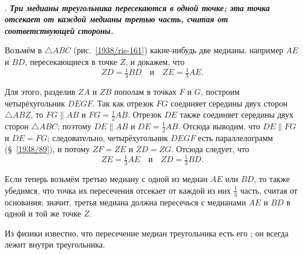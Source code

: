 \paragraph{}\label{1938/143} 
\mbox{.}
\textbf{\emph{Три медианы треугольника пересекаются в одной точке;
эта точка отсекает от каждой медианы третью часть, считая от соответствующей стороны.}}

Возьмём в $\triangle ABC$ (рис.~\ref{1938/ris-161}) какие-нибудь две медианы, например $AE$ и $BD$, пересекающиеся в точке $Z$, и докажем, что
\[ZD=\tfrac13 BD\quad\text{и}\quad ZE = \tfrac13 AE.\]

Для этого, разделив $ZA$ и $ZB$ пополам в точках $F$ и $G$, построим четырёхугольник $DEGF$.
Так как отрезок $FG$ соединяет середины двух сторон $\triangle ABZ$, то $FG\parallel AB$ и $FG=\tfrac12 AB$.
Отрезок $DE$ также соединяет середины двух сторон $\triangle ABC$;
поэтому $DE\parallel AB$ и $DE=\tfrac12 AB$.
Отсюда выводим, что $DE \parallel FG$ и $DE=FG$;
следовательно, четырёхугольник $DEGF$ есть параллелограмм (§~\ref{1938/89}), и потому $ZF=ZE$ и $ZD=ZG$.
Отсюда следует, что
\[ ZE=\tfrac13AE\quad\text{и}\quad ZD=\tfrac13 BD.\]

Если теперь возьмём третью медиану с одной из медиан $AE$ или $BD$, то также убедимся, что точка их пересечения отсекает от каждой из них $\tfrac13$ часть, считая от основания;
значит, третья медиана должна пересечься с медианами $AE$ и $BD$ в одной и той же точке $Z$.

Из физики известно, что пересечение медиан треугольника есть его ;
он всегда лежит внутри треугольника.

